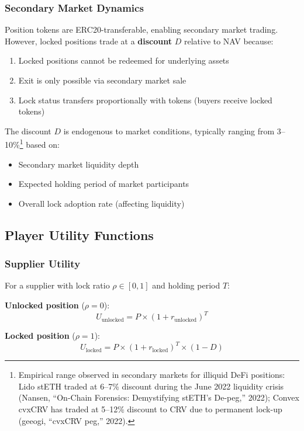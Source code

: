 \documentclass[10pt,a4paper,twocolumn]{article}
\begin{document}
\subsubsection{Secondary Market Dynamics}

Position tokens are ERC20-transferable, enabling secondary market trading. However, locked positions trade at a \textbf{discount} $D$ relative to NAV because:
\begin{enumerate}
    \item Locked positions cannot be redeemed for underlying assets
    \item Exit is only possible via secondary market sale
    \item Lock status transfers proportionally with tokens (buyers receive locked tokens)
\end{enumerate}

The discount $D$ is endogenous to market conditions, typically ranging from 3--10\%\footnote{Empirical range observed in secondary markets for illiquid DeFi positions: Lido stETH traded at 6--7\% discount during the June 2022 liquidity crisis (Nansen, ``On-Chain Forensics: Demystifying stETH's De-peg,'' 2022); Convex cvxCRV has traded at 5--12\% discount to CRV due to permanent lock-up (geeogi, ``cvxCRV peg,'' 2022).} based on:
\begin{itemize}
    \item Secondary market liquidity depth
    \item Expected holding period of market participants
    \item Overall lock adoption rate (affecting liquidity)
\end{itemize}

\subsection{Player Utility Functions}

\subsubsection{Supplier Utility}

For a supplier with lock ratio $\rho \in [0,1]$ and holding period $T$:

\textbf{Unlocked position} ($\rho = 0$):
\begin{equation}
U_{\text{unlocked}} = P \times (1 + r_{\text{unlocked}})^T
\end{equation}

\textbf{Locked position} ($\rho = 1$):
\begin{equation}
U_{\text{locked}} = P \times (1 + r_{\text{locked}})^T \times (1 - D)
\end{equation}
\end{document}
